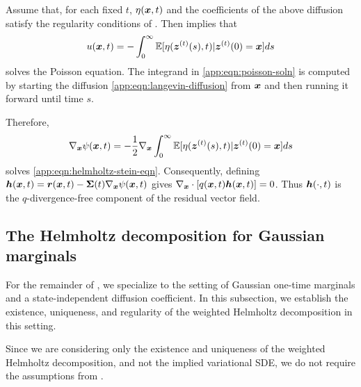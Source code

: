 Assume that, for each fixed $t$, $\eta(\boldsymbol{x}, t)$ and the coefficients of the above diffusion satisfy the regularity conditions of \citet[][Theorem 5]{gorham2019measuring}. Then \citet[][Theorem 5]{gorham2019measuring} implies that 
\begin{equation}\label{app:eqn:poisson-soln}
    u(\boldsymbol{x}, t) = -\int_0^\infty \mathbb{E}[\eta(\boldsymbol{z}^{(t)}(s), t) | \boldsymbol{z}^{(t)}(0) = \boldsymbol{x}]ds
\end{equation}
solves the Poisson equation. The integrand in \cref{app:eqn:poisson-soln} is computed by starting the diffusion \cref{app:eqn:langevin-diffusion} from $\boldsymbol{x}$ and then running it forward until time $s$.

Therefore,
\begin{equation}\label{app:eqn:helmholtz-soln}
    \nabla_{\boldsymbol{x}}\psi(\boldsymbol{x},t) =  -\frac{1}{2}\nabla_{\boldsymbol{x}} \int_0^\infty \mathbb{E}[\eta(\boldsymbol{z}^{(t)}(s), t) | \boldsymbol{z}^{(t)}(0) = \boldsymbol{x}]ds
\end{equation}
solves \cref{app:eqn:helmholtz-stein-eqn}. Consequently, defining $\boldsymbol{h}(\boldsymbol{x},t) = \boldsymbol{r}(\boldsymbol{x},t) - \boldsymbol{\Sigma}(t)\nabla_{\boldsymbol{x}}\psi(\boldsymbol{x},t)$
gives $\nabla_{\boldsymbol{x}} \cdot \left[ q(\boldsymbol{x},t)\boldsymbol{h}(\boldsymbol{x},t) \right] = 0$.
Thus $\boldsymbol{h}(\cdot,t)$ is the $q$-divergence-free component of the residual vector field.

\subsection{The Helmholtz decomposition for Gaussian marginals}\label{app:subsec:helmholtz-gaussian}

For the remainder of , we specialize to the setting of Gaussian one-time marginals and a state-independent diffusion coefficient.
In this subsection, we establish the existence,  uniqueness, and regularity of the weighted Helmholtz decomposition in this setting.

Since we are considering only the existence and uniqueness of the weighted Helmholtz decomposition, and not the implied variational SDE, we do not require the assumptions from .

